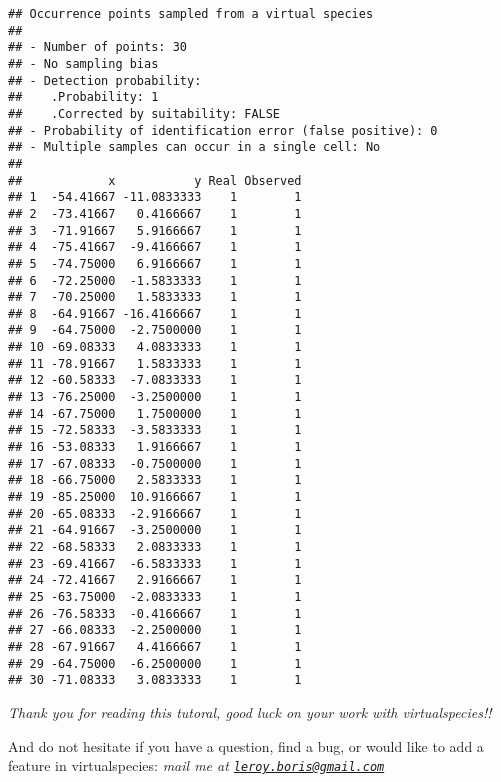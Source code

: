 \documentclass[]{article}
\begin{document}
\begin{verbatim}
## Occurrence points sampled from a virtual species
## 
## - Number of points: 30
## - No sampling bias
## - Detection probability: 
##    .Probability: 1
##    .Corrected by suitability: FALSE
## - Probability of identification error (false positive): 0
## - Multiple samples can occur in a single cell: No
## 
##            x           y Real Observed
## 1  -54.41667 -11.0833333    1        1
## 2  -73.41667   0.4166667    1        1
## 3  -71.91667   5.9166667    1        1
## 4  -75.41667  -9.4166667    1        1
## 5  -74.75000   6.9166667    1        1
## 6  -72.25000  -1.5833333    1        1
## 7  -70.25000   1.5833333    1        1
## 8  -64.91667 -16.4166667    1        1
## 9  -64.75000  -2.7500000    1        1
## 10 -69.08333   4.0833333    1        1
## 11 -78.91667   1.5833333    1        1
## 12 -60.58333  -7.0833333    1        1
## 13 -76.25000  -3.2500000    1        1
## 14 -67.75000   1.7500000    1        1
## 15 -72.58333  -3.5833333    1        1
## 16 -53.08333   1.9166667    1        1
## 17 -67.08333  -0.7500000    1        1
## 18 -66.75000   2.5833333    1        1
## 19 -85.25000  10.9166667    1        1
## 20 -65.08333  -2.9166667    1        1
## 21 -64.91667  -3.2500000    1        1
## 22 -68.58333   2.0833333    1        1
## 23 -69.41667  -6.5833333    1        1
## 24 -72.41667   2.9166667    1        1
## 25 -63.75000  -2.0833333    1        1
## 26 -76.58333  -0.4166667    1        1
## 27 -66.08333  -2.2500000    1        1
## 28 -67.91667   4.4166667    1        1
## 29 -64.75000  -6.2500000    1        1
## 30 -71.08333   3.0833333    1        1
\end{verbatim}

\emph{Thank you for reading this tutoral, good luck on your work with
virtualspecies!!}

And do not hesitate if you have a question, find a bug, or would like to
add a feature in virtualspecies: \emph{mail me at
\href{mailto:leroy.boris@gmail.com}{\nolinkurl{leroy.boris@gmail.com}}}
\end{document}
